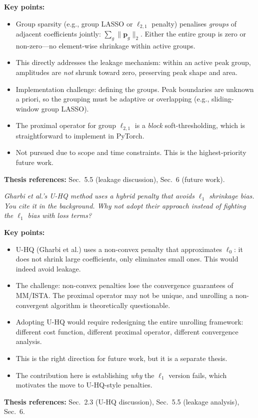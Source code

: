 \documentclass[11pt, letterpaper]{article}
\newcounter{qcounter}
\newcommand{\question}[1]{%
  \stepcounter{qcounter}%
  \begin{questionbox}[Q\theqcounter]%
    \itshape #1%
  \end{questionbox}%
}
\begin{document}
\begin{answerbox}
\textbf{Key points:}
\begin{itemize}[nosep]
  \item Group sparsity (e.g., group LASSO or $\ell_{2,1}$ penalty)
        penalises \emph{groups} of adjacent coefficients jointly:
        $\sum_g \|\mathbf{p}_g\|_2$.  Either the entire group is
        zero or non-zero---no element-wise shrinkage within active
        groups.
  \item This directly addresses the leakage mechanism: within an
        active peak group, amplitudes are \emph{not} shrunk toward
        zero, preserving peak shape and area.
  \item Implementation challenge: defining the groups.  Peak
        boundaries are unknown a priori, so the grouping must be
        adaptive or overlapping (e.g., sliding-window group LASSO).
  \item The proximal operator for group $\ell_{2,1}$ is a
        \emph{block} soft-thresholding, which is straightforward
        to implement in PyTorch.
  \item Not pursued due to scope and time constraints.  This is
        the highest-priority future work.
\end{itemize}
\textbf{Thesis references:} Sec.~5.5 (leakage discussion), Sec.~6 (future work).
\end{answerbox}

\question{Gharbi et al.'s U-HQ method uses a hybrid penalty that avoids
$\ell_1$ shrinkage bias.  You cite it in the background.  Why not
adopt their approach instead of fighting the $\ell_1$ bias with
loss terms?}

\begin{answerbox}
\textbf{Key points:}
\begin{itemize}[nosep]
  \item U-HQ (Gharbi et al.) uses a non-convex penalty that
        approximates $\ell_0$: it does not shrink large coefficients,
        only eliminates small ones.  This would indeed avoid leakage.
  \item The challenge: non-convex penalties lose the convergence
        guarantees of MM/ISTA.  The proximal operator may not be
        unique, and unrolling a non-convergent algorithm is
        theoretically questionable.
  \item Adopting U-HQ would require redesigning the entire unrolling
        framework: different cost function, different proximal operator,
        different convergence analysis.
  \item This is the right direction for future work, but it is a
        separate thesis.
  \item The contribution here is establishing \emph{why} the $\ell_1$
        version fails, which motivates the move to U-HQ-style penalties.
\end{itemize}
\textbf{Thesis references:} Sec.~2.3 (U-HQ discussion), Sec.~5.5 (leakage analysis), Sec.~6.
\end{answerbox}
\end{document}
